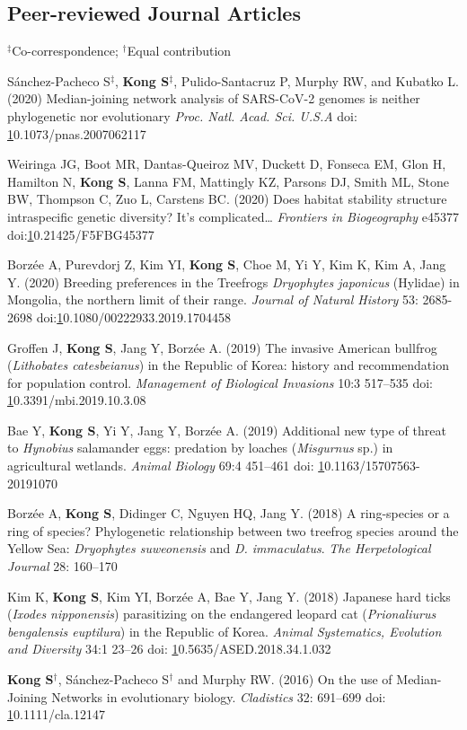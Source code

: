 \documentclass[10pt]{article}
\begin{document}
\subsection*{Peer-reviewed Journal Articles}
$^\ddag$Co-correspondence; $^\dag$Equal contribution
\begin{etaremune}

\item  Sánchez-Pacheco S{$^\ddag$}, \textbf{Kong S}{$^\ddag$}, Pulido-Santacruz P, Murphy RW, and Kubatko L. (2020) Median-joining network analysis of SARS-CoV-2 genomes is neither phylogenetic nor evolutionary \textit{Proc. Natl. Acad. Sci. U.S.A} doi: \href{https://doi.org/10.1073/pnas.2007062117}10.1073/pnas.2007062117
\item Weiringa JG, Boot MR,  Dantas-Queiroz MV, Duckett D, Fonseca EM, Glon H, Hamilton N, \textbf{Kong S}, Lanna FM, Mattingly KZ, Parsons DJ, Smith ML, Stone BW, Thompson C, Zuo L, Carstens BC. (2020) Does habitat stability structure intraspecific genetic diversity? It’s complicated… \textit{Frontiers in Biogeography} e45377 doi:\href{https://doi.org/10.21425/F5FBG45377}10.21425/F5FBG45377
\item Borzée A, Purevdorj Z, Kim YI, \textbf{Kong S}, Choe M, Yi Y, Kim K, Kim A, Jang Y. (2020) Breeding preferences in the Treefrogs \textit{Dryophytes japonicus} (Hylidae) in Mongolia, the northern limit of their range. \textit{Journal of Natural History} 53: 2685-2698 doi:\href{10.1080/00222933.2019.1704458}10.1080/00222933.2019.1704458
\item Groffen J, \textbf{Kong S}, Jang Y, Borzée A. (2019) The invasive American bullfrog (\textit{Lithobates catesbeianus}) in the Republic of Korea: history and recommendation for population control. \textit{Management of Biological Invasions} 10:3 517–535 doi: \href{10.3391/mbi.2019.10.3.08}10.3391/mbi.2019.10.3.08
\item Bae Y, \textbf{Kong S}, Yi Y, Jang Y, Borzée A. (2019) Additional new type of threat to \textit{Hynobius} salamander eggs: predation by loaches (\textit{Misgurnus} sp.) in agricultural wetlands. \textit{Animal Biology} 69:4 451–461 doi: \href{https://doi.org/10.1163/15707563-20191070}10.1163/15707563-20191070
\item Borzée A,\textbf{ Kong S}, Didinger C, Nguyen HQ, Jang Y. (2018) A ring-species or a ring of species? Phylogenetic relationship between two treefrog species around the Yellow Sea: \textit{Dryophytes suweonensis }and \textit{D. immaculatus}. \textit{The Herpetological Journal} 28: 160–170 
\item Kim K, \textbf{Kong S}, Kim YI, Borzée A, Bae Y, Jang Y. (2018) Japanese hard ticks (\textit{Ixodes nipponensis}) parasitizing on the endangered leopard cat (\textit{Prionaliurus bengalensis euptilura}) in the Republic of Korea. \textit{Animal Systematics, Evolution and Diversity} 34:1 23–26 doi: \href{10.5635/ASED.2018.34.1.032}10.5635/ASED.2018.34.1.032
\item \textbf{Kong S}{$^\dag$}, Sánchez-Pacheco S{$^\dag$} and Murphy RW. (2016) On the use of Median-Joining Networks in evolutionary biology. \textit{Cladistics} 32: 691–699 doi: \href{https://doi.org/10.1111/cla.12147}10.1111/cla.12147


\end{etaremune}
\end{document}
